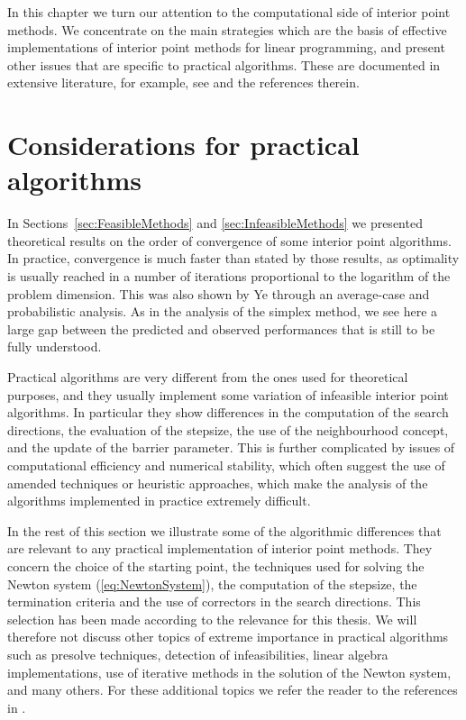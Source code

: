 
%
%
\label{ch:PracticalIpm}

In this chapter we turn our attention to the computational side of
interior point methods. We concentrate on the main strategies which are
the basis of effective implementations of interior point methods
for linear programming, and present other issues that are specific
to practical algorithms.
These are documented in extensive literature, for example, see
\cite{AndersenGondzioMeszarosXu,GondzioTerlaky,ipm:Wright97} 
and the references therein.


%
%
\section{Considerations for practical algorithms}

In Sections~\ref{sec:FeasibleMethods} and \ref{sec:InfeasibleMethods}
we presented theoretical
results on the order of convergence of some interior point algorithms.
In practice, convergence is much faster than stated by those results, as
optimality is usually reached in a number of iterations 
proportional to the logarithm of the problem dimension. 
This was also shown by Ye \cite[Chapter~6]{Ye97} through an
average-case and probabilistic analysis.
As in the analysis of the simplex method, we see here a large
gap between the predicted and observed performances that is still to
be fully understood.

Practical algorithms are very different from the ones used for
theoretical purposes, and they usually implement some variation
of infeasible interior point algorithms. In particular they show
differences in the computation of the search directions, 
the evaluation of the stepsize, 
the use of the neighbourhood concept, and the update of the
barrier parameter.
This is further complicated by issues of computational efficiency
and numerical stability, which often suggest the use of amended
techniques or heuristic approaches, which make
the analysis of the algorithms implemented in practice extremely difficult.

In the rest of this section we illustrate some of 
the algorithmic differences that are relevant to any 
practical implementation of interior point methods.
They concern the choice of the starting point, the techniques
used for solving the Newton system (\ref{eq:NewtonSystem}), the computation
of the stepsize, the termination criteria and the use
of correctors in the search directions.
This selection has been made according to the relevance
for this thesis.
We will therefore not discuss other topics of extreme importance 
in practical algorithms such as presolve techniques, 
detection of infeasibilities, linear algebra implementations, 
use of iterative methods in the solution of the Newton system,
and many others.
For these additional topics we refer the reader to the references in 
\cite{AndersenGondzioMeszarosXu,GondzioTerlaky}.


